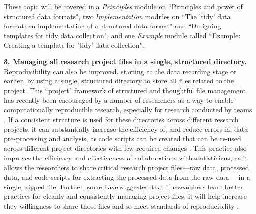 \documentclass[pdftex,english,11pt,parskip=half]{scrartcl}
\begin{document}
These topic will
be covered in a \textit{Principles} module on ``Principles and power of
structured data formats", two \textit{Implementation} modules on ``The 'tidy'
data format: an implementation of a structured data format" and ``Designing
templates for tidy data collection", and one \textit{Example} module called
``Example: Creating a template for 'tidy' data collection". 

\textbf{3. Managing all research project files in a single, structured directory.}
Reproducibility can also be improved, starting at the data recording stage or
earlier, by using a single, structured directory to store all files related to the
project. This ``project" framework of structured and thoughtful file management has recently been encouraged by a number of
researchers as a way to enable computationally reproducible research, especially
for research conducted by teams \cite{marwick2018packaging,
parker2017opinionated, lowndes2017our}. If a consistent structure is used for these directories across different research projects, it can substantially increase the efficiency of, and reduce errors in, data pre-processing and analysis, as code scripts can be created that can be re-used across different project directories with few required changes \cite{marwick2018packaging}. This practice also improves the efficiency and effectiveness of collaborations with statisticians, as it allows the researchers to share critical research project files---raw data, processed data, and code scripts for extracting the processed data from the raw data \cite{ellis2018share, shade2015computing}---in a single, zipped file. Further, some have suggested that if researchers learn better practices for cleanly and consistently managing project files, it will help increase they willingness to share those files and so meet standards of reproducibility \cite{marwick2018packaging}. 
\end{document}
